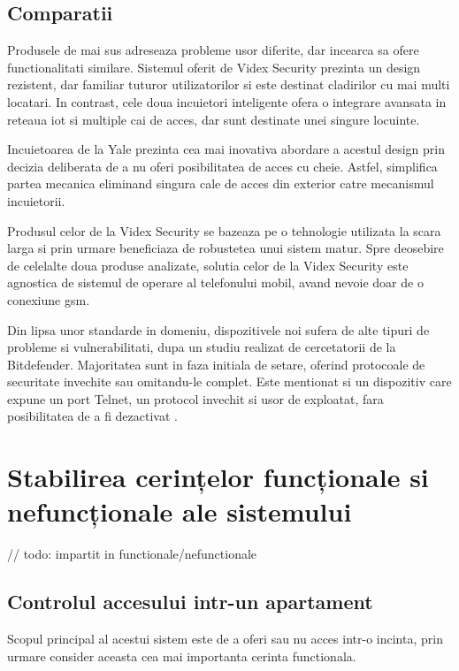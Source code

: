 \subsection {Comparatii}

Produsele de mai sus adreseaza probleme usor diferite, dar incearca sa ofere functionalitati similare. Sistemul oferit de Videx Security prezinta un design rezistent, dar familiar tuturor utilizatorilor si este destinat cladirilor cu mai multi locatari. In contrast, cele doua incuietori inteligente ofera o integrare avansata in reteaua \acrshort{iot} si multiple cai de acces, dar sunt destinate unei singure locuinte.

Incuietoarea de la Yale prezinta cea mai inovativa abordare a acestul design prin decizia deliberata de a nu oferi posibilitatea de acces cu cheie. Astfel, simplifica partea mecanica eliminand singura cale de acces din exterior catre mecanismul incuietorii.

Produsul celor de la Videx Security se bazeaza pe o tehnologie utilizata la scara larga si prin urmare beneficiaza de robustetea unui sistem matur. Spre deosebire de celelalte doua produse analizate, solutia celor de la Videx Security este agnostica de sistemul de operare al telefonului mobil, avand nevoie doar de o conexiune \acrshort{gsm}.

Din lipsa unor standarde in domeniu, dispozitivele noi sufera de alte tipuri de probleme si vulnerabilitati, dupa un studiu realizat de cercetatorii de la Bitdefender. Majoritatea sunt in faza initiala de setare, oferind protocoale de securitate invechite sau omitandu-le complet. Este mentionat si un dispozitiv care expune un port Telnet, un protocol invechit si usor de exploatat, fara posibilitatea de a fi dezactivat \cite{Bitdefender2016IoT}.

\section {Stabilirea cerințelor funcționale si nefuncționale ale sistemului}
// todo: impartit in functionale/nefunctionale

\subsection{Controlul accesului intr-un apartament}

Scopul principal al acestui sistem este de a oferi sau nu acces intr-o incinta, prin urmare consider aceasta cea mai importanta cerinta functionala.


